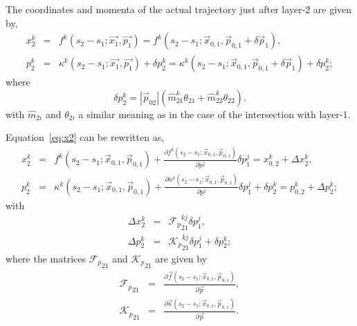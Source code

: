 The coordinates and momenta of the actual trajectory just after layer-2 are given by,
\begin{eqnarray}
  \label{eq:x2}
  x^{k}_{2} &=& f^{k}(s_2 - s_1;\vec{x_1},\vec{p_1}) = f^{k}(s_2 - s_1;\vec{x}_{0,1},\vec{p}_{0,1} + \delta \vec{p}_{1}), \\
  p^{k}_{2} &=& \kappa^{k}(s_2 - s_1;\vec{x_1},\vec{p_1}) + \delta p^{k}_{2} = \kappa^{k}(s_2 - s_1;\vec{x}_{0,1},\vec{p}_{0,1} + \delta \vec{p}_{1}) + \delta p^{k}_{2};
\end{eqnarray}
\noindent
where
\begin{equation}
  \delta p^{k}_{2} = |\vec{p}_{02}|(\hat{m}^{k}_{21}\theta_{21} + \hat{m}^{k}_{22}\theta_{22}).
\end{equation}
\noindent
with $\hat{m}_{2i}$ and $\theta_{2i}$ a similar meaning as in the case of the intersection with layer-1.

\noindent
Equation~\ref{eq:x2} can be rewritten as,
\begin{eqnarray}
  x^{k}_{2} &=& f^{k}(s_2 - s_1;\vec{x}_{0,1},\vec{p}_{0,1})      + \frac{\partial f^{k}(s_2 - s_1;\vec{x}_{0,1},\vec{p}_{0,1})}{\partial p^{j}} \delta p^{j}_{1}      = x^{k}_{0,2} + \Delta x^{k}_{2}, \\
  p^{k}_{2} &=& \kappa^{k}(s_2 - s_1;\vec{x}_{0,1},\vec{p}_{0,1}) + \frac{\partial \kappa^{k}(s_2 - s_1;\vec{x}_{0,1},\vec{p}_{0,1})}{\partial p^{j}} \delta p^{j}_{1} + \delta p^{k}_{2} = p^{k}_{0,2} + \Delta p^{k}_{2};
\end{eqnarray}
\noindent
with
\begin{eqnarray}
  \label{eq:DelX2}
  \Delta x^{k}_{2} &=& {\mathcal F_{p}}^{kj}_{21} \delta p^{j}_{1}, \\
  \Delta p^{k}_{2} &=& {\mathcal K_{p}}^{kj}_{21} \delta p^{j}_{1}  + \delta p^{k}_{2};
\end{eqnarray}
\noindent
where the matrices ${\mathcal F_{p}}_{21}$ and ${\mathcal K_{p}}_{21}$ are given by
\begin{eqnarray}
  {\mathcal F_{p}}_{21} &=& \frac{\partial \vec{f}(s_2 - s_1;\vec{x}_{0,1},\vec{p}_{0,1})}{\partial \vec{p}}, \\
  {\mathcal K_{p}}_{21} &=& \frac{\partial \vec{\kappa}(s_2 - s_1;\vec{x}_{0,1},\vec{p}_{0,1})}{\partial \vec{p}}.
\end{eqnarray}

